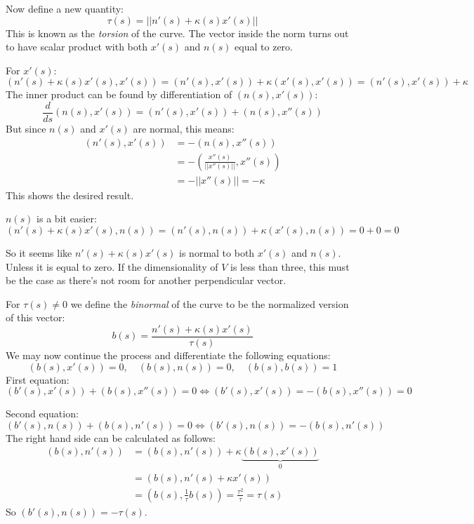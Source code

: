 \documentclass[12pt, a4paper]{article}
\numberwithin{equation}{section}
\begin{document}
Now define a new quantity:
\begin{equation}
\tau(s)=||n'(s)+\kappa(s)x'(s)||
\end{equation}
This is known as the \textit{torsion} of the curve. The vector inside the norm turns out to have scalar product with both $x'(s)$ and $n(s)$ equal to zero.

For $x'(s)$:
\begin{equation}
(n'(s)+\kappa(s)x'(s),x'(s))=(n'(s),x'(s))+\kappa(x'(s),x'(s))=(n'(s),x'(s))+\kappa
\end{equation}
The inner product can be found by differentiation of $(n(s),x'(s))$:
\begin{equation}
\frac{d}{ds}(n(s),x'(s))=(n'(s),x'(s))+(n(s),x''(s))
\end{equation}
But since $n(s)$ and $x'(s)$ are normal, this means:
\begin{align}
(n'(s),x'(s))&=-(n(s),x''(s))\\
&=-\left(\frac{x''(s)}{||x''(s)||},x''(s)\right)\\
&=-||x''(s)||=-\kappa
\end{align}
This shows the desired result.

$n(s)$ is a bit easier:
\begin{equation}
(n'(s)+\kappa(s)x'(s),n(s))=(n'(s),n(s))+\kappa(x'(s),n(s))=0+0=0
\end{equation}

So it seems like $n'(s)+\kappa(s)x'(s)$ is normal to both $x'(s)$ and $n(s)$. Unless it is equal to zero. If the dimensionality of $V$ is less than three, this must be the case as there's not room for another perpendicular vector.

For $\tau(s)\neq 0$ we define the \textit{binormal} of the curve to be the normalized version of this vector:
\begin{equation}
b(s)=\frac{n'(s)+\kappa(s)x'(s)}{\tau(s)}
\end{equation}
We may now continue the process and differentiate the following equations:
\begin{equation}
(b(s),x'(s))=0,\quad(b(s),n(s))=0,\quad (b(s),b(s))=1
\end{equation}
First equation:
\begin{equation}
(b'(s),x'(s))+(b(s),x''(s))=0\Leftrightarrow(b'(s),x'(s))=-(b(s),x''(s))=0
\end{equation}

Second equation:
\begin{equation}
(b'(s),n(s))+(b(s),n'(s))=0\Leftrightarrow(b'(s),n(s))=-(b(s),n'(s))
\end{equation}
The right hand side can be calculated as follows:
\begin{align}
(b(s),n'(s))&=(b(s),n'(s))+\kappa\underbrace{(b(s),x'(s))}_{0}\\
&=(b(s),n'(s)+\kappa x'(s))\\
&=\left(b(s),\frac{1}{\tau}b(s)\right)=\frac{\tau^2}{\tau}=\tau(s)
\end{align}
So $(b'(s),n(s))=-\tau(s)$.
\end{document}
